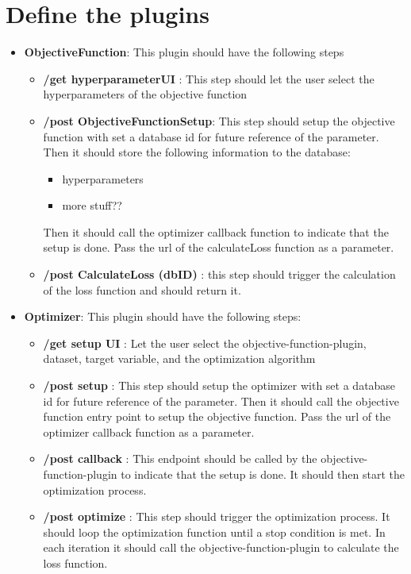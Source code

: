 \documentclass[
  a4paper,  %
  twoside,  %
  bibliography=totoc,
  headsepline,
  cleardoublepage=empty,
  parskip=half,
  draft=false
]{scrbook}
\begin{document}
\chapter{Define the plugins}
\begin{itemize}
  \item \textbf{ObjectiveFunction}: This plugin should have the following steps
  \begin{itemize}
    \item \textbf{ /get hyperparameterUI }: This step should let the user select the hyperparameters of the objective function
    \item \textbf{ /post ObjectiveFunctionSetup}: This step should setup the objective function with set a database id for future reference of the parameter. 
    Then it should store the following information to the database:
    \begin{itemize}
      \item hyperparameters
      \item more stuff?? %
    \end{itemize}
    Then it should call the optimizer callback function to indicate that the setup is done. Pass the url of the calculateLoss function as a parameter.
    \item \textbf{ /post CalculateLoss (dbID) }: this step should trigger the calculation of the loss function and should return it.
  \end{itemize}
  \item \textbf{Optimizer}: This plugin should have the following steps:
    \begin{itemize}
      \item \textbf{ /get setup UI }: Let the user select the objective-function-plugin, dataset, target variable, and the optimization algorithm
      \item \textbf{ /post setup }: This step should setup the optimizer with set a database id for future reference of the parameter. 
      Then it should call the objective function entry point to setup the objective function. Pass the url of the optimizer callback function as a parameter.
      \item \textbf{ /post callback }: This endpoint should be called by the objective-function-plugin to indicate that the setup is done.
      It should then start the optimization process.
      \item \textbf{ /post optimize }: This step should trigger the optimization process.
      It should loop the optimization function until a stop condition is met.
      In each iteration it should call the objective-function-plugin to calculate the loss function.
    \end{itemize}
\end{itemize}
\end{document}
